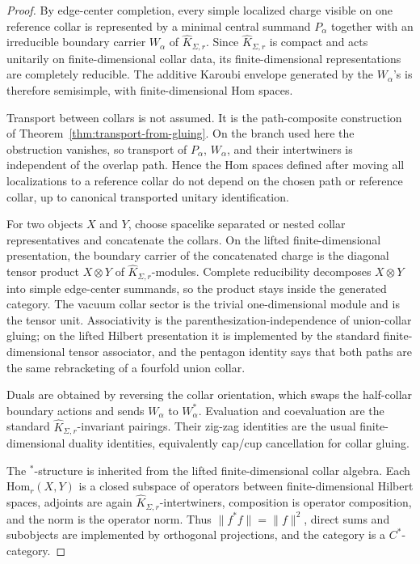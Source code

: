 \documentclass[11pt]{article}
\begin{document}
\begin{proof}
By edge-center completion, every simple localized charge visible on one reference collar is
represented by a minimal central summand \(P_\alpha\) together with an irreducible boundary carrier
\(W_\alpha\) of \(\widehat K_{\Sigma,r}\). Since \(\widehat K_{\Sigma,r}\) is compact and acts
unitarily on finite-dimensional collar data, its finite-dimensional representations are completely
reducible. The additive Karoubi envelope generated by the \(W_\alpha\)'s is therefore semisimple,
with finite-dimensional Hom spaces.

Transport between collars is not assumed. It is the path-composite construction of
Theorem~\ref{thm:transport-from-gluing}. On the branch used here the obstruction vanishes, so
transport of \(P_\alpha\), \(W_\alpha\), and their intertwiners is independent of the overlap path.
Hence the Hom spaces defined after moving all localizations to a reference collar do not depend on
the chosen path or reference collar, up to canonical transported unitary identification.

For two objects \(X\) and \(Y\), choose spacelike separated or nested collar representatives and
concatenate the collars. On the lifted finite-dimensional presentation, the boundary carrier of
the concatenated charge is the diagonal tensor product \(X\otimes Y\) of
\(\widehat K_{\Sigma,r}\)-modules. Complete reducibility decomposes \(X\otimes Y\) into simple
edge-center summands, so the product stays inside the generated category. The vacuum collar sector
is the trivial one-dimensional module and is the tensor unit. Associativity is the
parenthesization-independence of union-collar gluing; on the lifted Hilbert presentation it is
implemented by the standard finite-dimensional tensor associator, and the pentagon identity says
that both paths are the same rebracketing of a fourfold union collar.

Duals are obtained by reversing the collar orientation, which swaps the half-collar boundary
actions and sends \(W_\alpha\) to \(W_\alpha^*\). Evaluation and coevaluation are the standard
\(\widehat K_{\Sigma,r}\)-invariant pairings. Their zig-zag identities are the usual
finite-dimensional duality identities, equivalently cap/cup cancellation for collar gluing.

The \(^*\)-structure is inherited from the lifted finite-dimensional collar algebra. Each
\(\mathrm{Hom}_r(X,Y)\) is a closed subspace of operators between finite-dimensional Hilbert
spaces, adjoints are again \(\widehat K_{\Sigma,r}\)-intertwiners, composition is operator
composition, and the norm is the operator norm. Thus \(\|f^*f\|=\|f\|^2\), direct sums and
subobjects are implemented by orthogonal projections, and the category is a \(C^*\)-category.


\end{proof}
\end{document}
